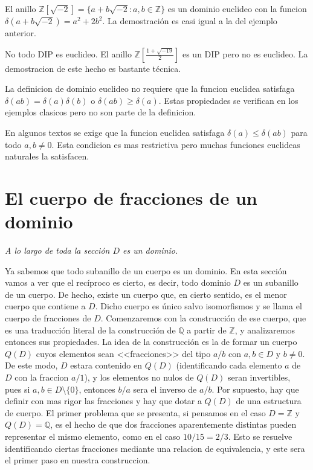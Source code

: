 \begin{example}{}{}
El anillo \(\mathbb{Z}[\sqrt{-2}] = \{a + b\sqrt{-2} : a, b \in \mathbb{Z}\}\) es un dominio euclideo con la funcion \(\delta(a + b\sqrt{-2}) = a^2 + 2b^2\). La demostración es casi igual a la del ejemplo anterior.
\end{example}

\begin{example}{}{}
No todo DIP es euclideo. El anillo \(\mathbb{Z}[\frac{1 + \sqrt{-19}}{2}]\) es un DIP pero no es euclideo. La demostracion de este hecho es bastante técnica.
\end{example}

\begin{remark}
La definicion de dominio euclideo no requiere que la funcion euclidea satisfaga \(\delta(ab) = \delta(a)\delta(b)\) o \(\delta(ab) \geq \delta(a)\). Estas propiedades se verifican en los ejemplos clasicos pero no son parte de la definicion.
\end{remark}

\begin{remark}
En algunos textos se exige que la funcion euclidea satisfaga \(\delta(a) \leq \delta(ab)\) para todo \(a, b \neq 0\). Esta condicion es mas restrictiva pero muchas funciones euclideas naturales la satisfacen.
\end{remark}

\clearpage
\section{El cuerpo de fracciones de un dominio}

\emph{A lo largo de toda la sección \(D\) es un dominio.}

Ya sabemos que todo subanillo de un cuerpo es un dominio. En esta sección vamos a ver que el recíproco es cierto, es decir, todo dominio \(D\) es un subanillo de un cuerpo. De hecho, existe un cuerpo que, en cierto sentido, es el menor cuerpo que contiene a \(D\). Dicho cuerpo es único salvo isomorfismos y se llama el cuerpo de fracciones de \(D\). Comenzaremos con la construcción de ese cuerpo, que es una traducción literal de la construcción de \(\mathbb{Q}\) a partir de \(\mathbb{Z}\), y analizaremos entonces sus propiedades. La idea de la construcción es la de formar un cuerpo \(Q(D)\) cuyos elementos sean <<fracciones>> del tipo \(a/b\) con \(a,b \in D\) y \(b \neq 0\). De este modo, \(D\) estara contenido en \(Q(D)\) (identificando cada elemento \(a\) de \(D\) con la fraccion \(a/1\)), y los elementos no nulos de \(Q(D)\) seran invertibles, pues si \(a,b \in D \setminus \{0\}\), entonces \(b/a\) sera el inverso de \(a/b\). Por supuesto, hay que definir con mas rigor las fracciones y hay que dotar a \(Q(D)\) de una estructura de cuerpo. El primer problema que se presenta, si pensamos en el caso \(D = \mathbb{Z}\) y \(Q(D) = \mathbb{Q}\), es el hecho de que dos fracciones aparentemente distintas pueden representar el mismo elemento, como en el caso \(10/15 = 2/3\). Esto se resuelve identificando ciertas fracciones mediante una relacion de equivalencia, y este sera el primer paso en nuestra construccion.

